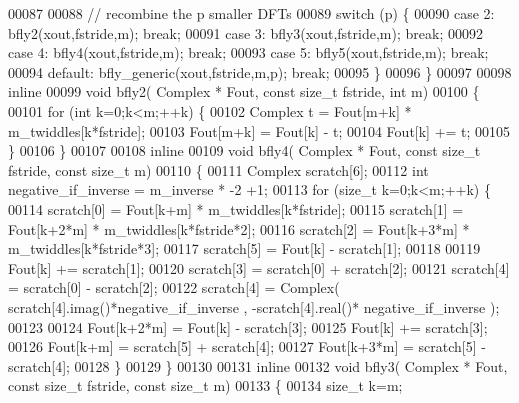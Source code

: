 \begin{DoxyCode}
00087 
00088       \textcolor{comment}{// recombine the p smaller DFTs }
00089       \textcolor{keywordflow}{switch} (p) \{
00090         \textcolor{keywordflow}{case} 2: bfly2(xout,fstride,m); \textcolor{keywordflow}{break};
00091         \textcolor{keywordflow}{case} 3: bfly3(xout,fstride,m); \textcolor{keywordflow}{break};
00092         \textcolor{keywordflow}{case} 4: bfly4(xout,fstride,m); \textcolor{keywordflow}{break};
00093         \textcolor{keywordflow}{case} 5: bfly5(xout,fstride,m); \textcolor{keywordflow}{break};
00094         \textcolor{keywordflow}{default}: bfly\_generic(xout,fstride,m,p); \textcolor{keywordflow}{break};
00095       \}
00096     \}
00097 
00098   \textcolor{keyword}{inline}
00099     \textcolor{keywordtype}{void} bfly2( Complex * Fout, \textcolor{keyword}{const} \textcolor{keywordtype}{size\_t} fstride, \textcolor{keywordtype}{int} m)
00100     \{
00101       \textcolor{keywordflow}{for} (\textcolor{keywordtype}{int} k=0;k<m;++k) \{
00102         Complex t = Fout[m+k] * m\_twiddles[k*fstride];
00103         Fout[m+k] = Fout[k] - t;
00104         Fout[k] += t;
00105       \}
00106     \}
00107 
00108   \textcolor{keyword}{inline}
00109     \textcolor{keywordtype}{void} bfly4( Complex * Fout, \textcolor{keyword}{const} \textcolor{keywordtype}{size\_t} fstride, \textcolor{keyword}{const} \textcolor{keywordtype}{size\_t} m)
00110     \{
00111       Complex scratch[6];
00112       \textcolor{keywordtype}{int} negative\_if\_inverse = m\_inverse * -2 +1;
00113       \textcolor{keywordflow}{for} (\textcolor{keywordtype}{size\_t} k=0;k<m;++k) \{
00114         scratch[0] = Fout[k+m] * m\_twiddles[k*fstride];
00115         scratch[1] = Fout[k+2*m] * m\_twiddles[k*fstride*2];
00116         scratch[2] = Fout[k+3*m] * m\_twiddles[k*fstride*3];
00117         scratch[5] = Fout[k] - scratch[1];
00118 
00119         Fout[k] += scratch[1];
00120         scratch[3] = scratch[0] + scratch[2];
00121         scratch[4] = scratch[0] - scratch[2];
00122         scratch[4] = Complex( scratch[4].imag()*negative\_if\_inverse , -scratch[4].real()* 
      negative\_if\_inverse );
00123 
00124         Fout[k+2*m]  = Fout[k] - scratch[3];
00125         Fout[k] += scratch[3];
00126         Fout[k+m] = scratch[5] + scratch[4];
00127         Fout[k+3*m] = scratch[5] - scratch[4];
00128       \}
00129     \}
00130 
00131   \textcolor{keyword}{inline}
00132     \textcolor{keywordtype}{void} bfly3( Complex * Fout, \textcolor{keyword}{const} \textcolor{keywordtype}{size\_t} fstride, \textcolor{keyword}{const} \textcolor{keywordtype}{size\_t} m)
00133     \{
00134       \textcolor{keywordtype}{size\_t} k=m;

\end{DoxyCode}
